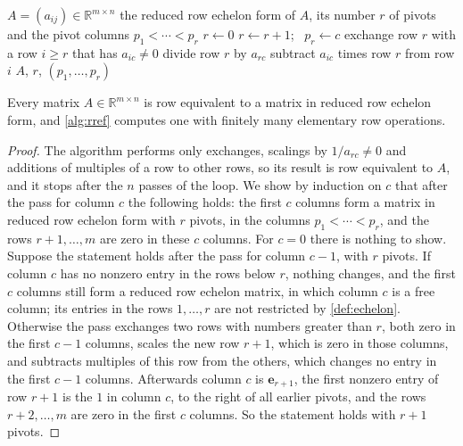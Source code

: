 \begin{algorithm}
\begin{algorithmic}[1]
\Require $A=(a_{ij})\in\mathbb R^{m\times n}$
\Ensure the reduced row echelon form of $A$, its number $r$ of pivots and the pivot columns $p_1<\cdots<p_r$
\State $r\gets0$ 
    \State $r\gets r+1$; \ $p_r\gets c$
    \State exchange row $r$ with a row $i\ge r$ that has $a_{ic}\ne0$
    \State divide row $r$ by $a_{rc}$ 
      \State subtract $a_{ic}$ times row $r$ from row $i$ 
    \EndFor
  \EndIf
\EndFor
\State \Return $A$, $r$, $(p_1,\ldots,p_r)$
\end{algorithmic}
\caption{Gauss--Jordan elimination to reduced row echelon form. Every operation is an elementary row operation, so the result is row equivalent to the input (\cref{thm:rref-existence}).}
\label{alg:rref}
\end{algorithm}

\begin{theorem}
\label{thm:rref-existence}
Every matrix $A\in\mathbb R^{m\times n}$ is row equivalent to a matrix in reduced row echelon form, and \cref{alg:rref} computes one with finitely many elementary row operations.
\end{theorem}

\begin{proof}
The algorithm performs only exchanges, scalings by $1/a_{rc}\ne0$ and additions of multiples of a row to other rows, so its result is row equivalent to $A$, and it stops after the $n$ passes of the loop. We show by induction on $c$ that after the pass for column $c$ the following holds: the first $c$ columns form a matrix in reduced row echelon form with $r$ pivots, in the columns $p_1<\cdots<p_r$, and the rows $r+1,\ldots,m$ are zero in these $c$ columns. For $c=0$ there is nothing to show. Suppose the statement holds after the pass for column $c-1$, with $r$ pivots. If column $c$ has no nonzero entry in the rows below $r$, nothing changes, and the first $c$ columns still form a reduced row echelon matrix, in which column $c$ is a free column; its entries in the rows $1,\ldots,r$ are not restricted by \cref{def:echelon}. Otherwise the pass exchanges two rows with numbers greater than $r$, both zero in the first $c-1$ columns, scales the new row $r+1$, which is zero in those columns, and subtracts multiples of this row from the others, which changes no entry in the first $c-1$ columns. Afterwards column $c$ is $\mathbf e_{r+1}$, the first nonzero entry of row $r+1$ is the $1$ in column $c$, to the right of all earlier pivots, and the rows $r+2,\ldots,m$ are zero in the first $c$ columns. So the statement holds with $r+1$ pivots.
\end{proof}

